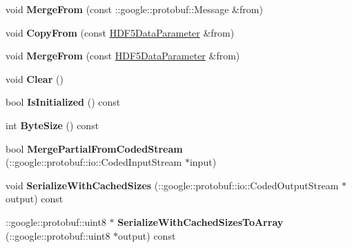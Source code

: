 \begin{DoxyCompactItemize}
void {\bfseries Merge\+From} (const \+::google\+::protobuf\+::\+Message \&from)
\item 
\mbox{\label{classcaffe_1_1_h_d_f5_data_parameter_ae15d2cc8bc43a767be3347612c98b182}} 
void {\bfseries Copy\+From} (const \mbox{\hyperlink{classcaffe_1_1_h_d_f5_data_parameter}{H\+D\+F5\+Data\+Parameter}} \&from)
\item 
\mbox{\label{classcaffe_1_1_h_d_f5_data_parameter_a953f138e42bdb37b2e4fbb44ef19b4ea}} 
void {\bfseries Merge\+From} (const \mbox{\hyperlink{classcaffe_1_1_h_d_f5_data_parameter}{H\+D\+F5\+Data\+Parameter}} \&from)
\item 
\mbox{\label{classcaffe_1_1_h_d_f5_data_parameter_ac1311b334997ea952ab6fd47d0d2fc92}} 
void {\bfseries Clear} ()
\item 
\mbox{\label{classcaffe_1_1_h_d_f5_data_parameter_a507f8cc32c9a387d2c9282e8950a17fb}} 
bool {\bfseries Is\+Initialized} () const
\item 
\mbox{\label{classcaffe_1_1_h_d_f5_data_parameter_a5e2ac4de453f0d7bfe165feef8f9bb26}} 
int {\bfseries Byte\+Size} () const
\item 
\mbox{\label{classcaffe_1_1_h_d_f5_data_parameter_ad4fa1f44f734b9e2f35e04050d0a75c9}} 
bool {\bfseries Merge\+Partial\+From\+Coded\+Stream} (\+::google\+::protobuf\+::io\+::\+Coded\+Input\+Stream $\ast$input)
\item 
\mbox{\label{classcaffe_1_1_h_d_f5_data_parameter_a906c57675c74cdf9d4198896684a1ba2}} 
void {\bfseries Serialize\+With\+Cached\+Sizes} (\+::google\+::protobuf\+::io\+::\+Coded\+Output\+Stream $\ast$output) const
\item 
\mbox{\label{classcaffe_1_1_h_d_f5_data_parameter_adef237757dffd40a17af7566734c3b4c}} 
\+::google\+::protobuf\+::uint8 $\ast$ {\bfseries Serialize\+With\+Cached\+Sizes\+To\+Array} (\+::google\+::protobuf\+::uint8 $\ast$output) const
\item 

\end{DoxyCompactItemize}
